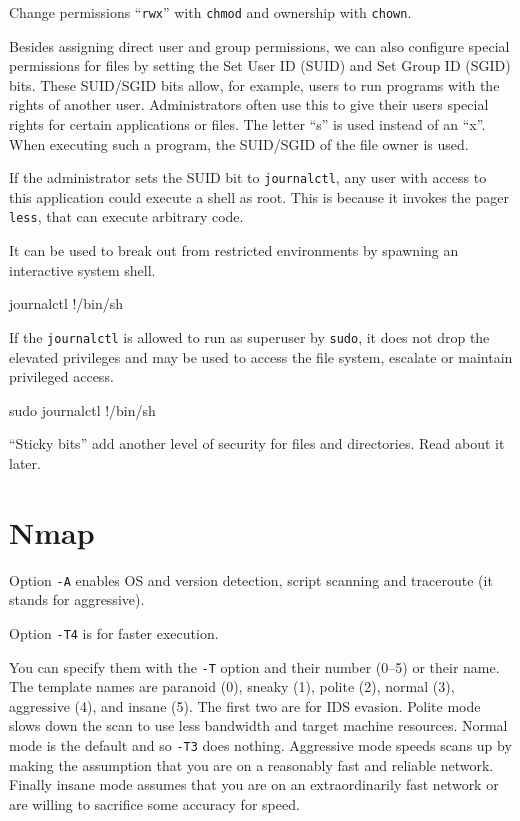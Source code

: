\documentclass[a4paper,12pt]{article}
\newcommand{\bashinline}[1]{\texttt{#1}}
\begin{document}
Change permissions ``\texttt{rwx}'' with \bashinline{chmod} and ownership with \bashinline{chown}.

\n

Besides assigning direct user and group permissions, we can also configure special permissions for files by setting the Set User ID (SUID) and Set Group ID (SGID) bits. These SUID/SGID bits allow, for example, users to run programs with the rights of another user. Administrators often use this to give their users special rights for certain applications or files. The letter ``s'' is used instead of an ``x''. When executing such a program, the SUID/SGID of the file owner is used.

\n
If the administrator sets the SUID bit to \bashinline{journalctl}, any user with access to this application could execute a shell as root. This is because it invokes the pager \bashinline{less}, that can execute arbitrary code.

It can be used to break out from restricted environments by spawning an interactive system shell.
\begin{bash}
journalctl
!/bin/sh
\end{bash}

If the \bashinline{journalctl} is allowed to run as superuser by \bashinline{sudo}, it does not drop the elevated privileges and may be used to access the file system, escalate or maintain privileged access.
\begin{bash}
sudo journalctl
!/bin/sh
\end{bash}

``Sticky bits'' add another level of security for files and directories. Read about it later.



\pagebreak

\section{Nmap}

Option \bashinline{-A} enables OS and version detection, script scanning and traceroute (it stands for aggressive).

\n

Option \bashinline{-T4} is for faster execution.

\n

You can specify them with the \bashinline{-T} option and their number (0–5) or their name. The template names are paranoid (0),
sneaky (1), polite (2), normal (3), aggressive (4), and insane (5). The first two are for IDS evasion. Polite mode slows down the scan to use less bandwidth and target machine resources. Normal mode is the default and
so \bashinline{-T3} does nothing. Aggressive mode speeds scans up by making the assumption that you are on a reasonably fast and reliable network. Finally insane mode assumes that you are on an extraordinarily fast network or are
willing to sacrifice some accuracy for speed.
\end{document}
